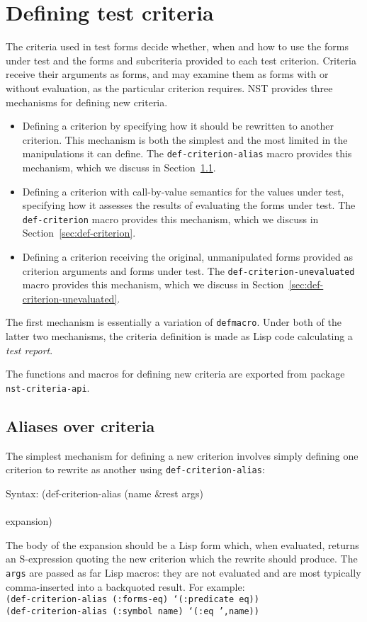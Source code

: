 
\section{Defining test criteria}
The criteria used in test forms decide whether, when and how to use
the forms under test and the forms and subcriteria provided to each
test criterion.  Criteria receive their arguments as forms, and may
examine them as forms with or without evaluation, as the particular
criterion requires.  NST provides three mechanisms for defining new
criteria.
\begin{itemize}
\item Defining a criterion by specifying how it should be rewritten to
  another criterion.  This mechanism is both the simplest and the most
  limited in the manipulations it can define.  The
  \texttt{def-criterion-alias} macro provides this mechanism, which we
  discuss in Section~\ref{sec:def-criterion-alias}.
\item Defining a criterion with call-by-value semantics for the values
  under test, specifying how it assesses the results of evaluating the
  forms under test.  The \texttt{def-criterion} macro provides this
  mechanism, which we discuss in Section~\ref{sec:def-criterion}.
\item Defining a criterion receiving the original, unmanipulated forms
  provided as criterion arguments and forms under test.  The
  \texttt{def-criterion-unevaluated} macro provides this mechanism,
  which we discuss in Section~\ref{sec:def-criterion-unevaluated}.
\end{itemize}
The first mechanism is essentially a variation of \texttt{defmacro}.
Under both of the latter two mechanisms, the criteria definition is
made as Lisp code calculating a \emph{test report}.

The functions and macros for defining new criteria are exported from
package \texttt{nst-criteria-api}.

\subsection{Aliases over criteria}
\label{sec:def-criterion-alias}
The simplest mechanism for defining a new criterion involves simply
defining one criterion to rewrite as another using
\texttt{def-criterion-alias}:
%
{\ttfamily\begin{tabbing}
\textrm{Syntax: 
}(de\=f-criterion-alias (name \&rest args)
\\ \> [ documentation ]
\\ \> expansion)
\end{tabbing}}
The body of the expansion should be a Lisp form which, when evaluated,
returns an S-expression quoting the new criterion which the rewrite
should produce.  The \texttt{args} are passed as far Lisp macros: they
are not evaluated and are most typically comma-inserted into a
backquoted result.  For example:
\\ \texttt{(def-criterion-alias (:forms-eq) `(:predicate eq))}
\\ \texttt{(def-criterion-alias (:symbol name) `(:eq ',name))}

